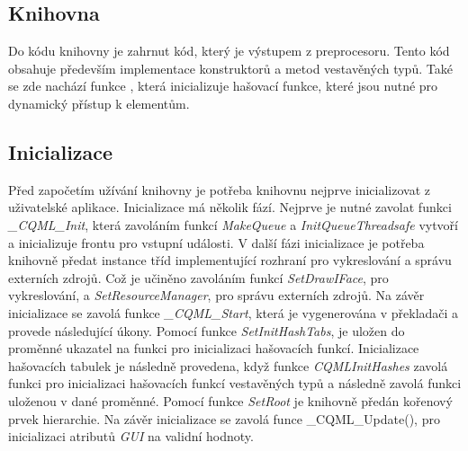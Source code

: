 \documentclass[11pt,twoside,a4paper]{book}
\begin{document}
{{\begin{ttemize}
{{\begin{lastlisting}[frame=single,caption=Řešení v pseudokódu problematického použití operátoru "." v přiřazovacím výroku,label=lst:var0N]
\section{\label{SEC:aa}Knihovna}
Do kódu knihovny je zahrnut kód, který je výstupem z preprocesoru. Tento kód obsahuje především implementace konstruktorů a metod vestavěných typů. Také se zde nachází funkce , která inicializuje hašovací funkce, které jsou nutné pro dynamický přístup k elementům.

\subsection{Inicializace}
Před započetím užívání knihovny je potřeba knihovnu nejprve inicializovat z uživatelské aplikace. Inicializace má několik fází. Nejprve je nutné zavolat funkci \textit{\_CQML\_Init}, která zavoláním funkcí \textit{MakeQueue} a \textit{InitQueueThreadsafe} vytvoří a inicializuje frontu pro vstupní události.
V další fázi inicializace je potřeba knihovně předat instance tříd implementující rozhraní pro vykreslování a správu externích zdrojů. Což je učiněno zavoláním funkcí \textit{SetDrawIFace}, pro vykreslování, a \textit{SetResourceManager}, pro správu externích zdrojů.
Na závěr inicializace se zavolá funkce \textit{\_CQML\_Start}, která je vygenerována v překladači a provede následující úkony.
Pomocí funkce \textit{SetInitHashTabs}, je uložen do proměnné ukazatel na funkci pro inicializaci hašovacích funkcí. Inicializace hašovacích tabulek je následně provedena, když funkce \textit{CQMLInitHashes} zavolá funkci  pro inicializaci hašovacích funkcí vestavěných typů a následně zavolá funkci uloženou v dané proměnné. Pomocí funkce \textit{SetRoot} je knihovně předán kořenový prvek hierarchie. Na závěr inicializace se zavolá funce \_CQML\_Update(), pro inicializaci atributů \textit{GUI} na validní hodnoty.	


\end{lastlisting}}}
\end{ttemize}}}
\end{document}
